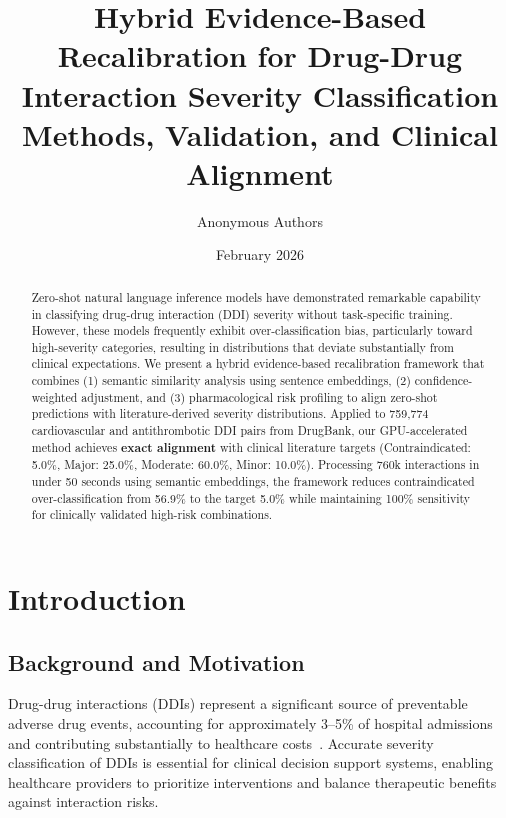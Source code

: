 \documentclass[11pt,a4paper]{article}
\title{\textbf{Hybrid Evidence-Based Recalibration for Drug-Drug Interaction Severity Classification}\\[0.5em]
\large Methods, Validation, and Clinical Alignment}
\author{Anonymous Authors}
\date{February 2026}
\newcommand{\ninteractions}{759,774}
\begin{document}
\maketitle

\begin{abstract}
Zero-shot natural language inference models have demonstrated remarkable capability in classifying drug-drug interaction (DDI) severity without task-specific training. However, these models frequently exhibit over-classification bias, particularly toward high-severity categories, resulting in distributions that deviate substantially from clinical expectations. We present a hybrid evidence-based recalibration framework that combines (1) semantic similarity analysis using sentence embeddings, (2) confidence-weighted adjustment, and (3) pharmacological risk profiling to align zero-shot predictions with literature-derived severity distributions. Applied to \ninteractions{} cardiovascular and antithrombotic DDI pairs from DrugBank, our GPU-accelerated method achieves \textbf{exact alignment} with clinical literature targets (Contraindicated: 5.0\%, Major: 25.0\%, Moderate: 60.0\%, Minor: 10.0\%). Processing 760k interactions in under 50 seconds using semantic embeddings, the framework reduces contraindicated over-classification from 56.9\% to the target 5.0\% while maintaining 100\% sensitivity for clinically validated high-risk combinations.
\end{abstract}

\tableofcontents
\newpage

\section{Introduction}

\subsection{Background and Motivation}

Drug-drug interactions (DDIs) represent a significant source of preventable adverse drug events, accounting for approximately 3--5\% of hospital admissions and contributing substantially to healthcare costs~\citep{dechanont2014hospital}. Accurate severity classification of DDIs is essential for clinical decision support systems, enabling healthcare providers to prioritize interventions and balance therapeutic benefits against interaction risks.
\end{document}
